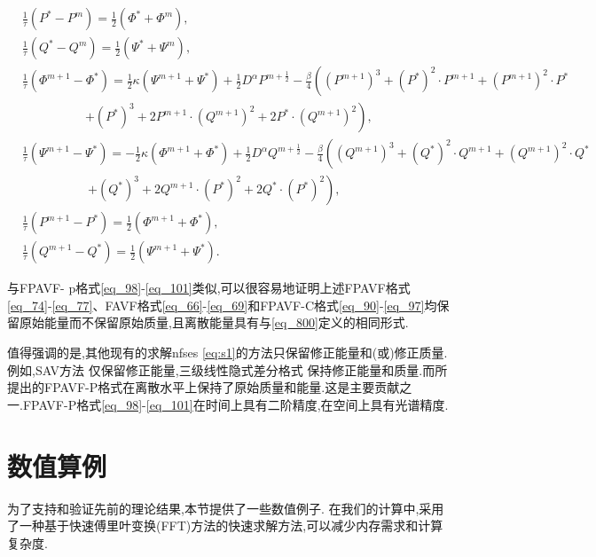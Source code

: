 \begin{enumerate}[$\bullet$]
\begin{align}
&\frac{1}{\tau}\left(P^{*}-P^{m}\right)=\frac{1}{2}(\varPhi^{*}+\varPhi^{m}),\label{eq_92}\\
&\frac{1}{\tau}\left(Q^{*}-Q^{m}\right)=\frac{1}{2}(\Psi^{*}+\Psi^{m}),\label{eq_93}\\
&\frac{1}{\tau}\left(\varPhi^{m+1}-\varPhi^{*}\right)=\frac{1}{2}\kappa (\Psi^{m+1}+\Psi^{*})+\frac{1}{2}D^{\alpha} P^{m+\frac{1}{2}}-\frac{\beta}{4}\left((P^{m+1})^3+(P^{*})^{2}\cdot P^{m+1}+(P^{m+1})^{2}\cdot P^{*}\right.\nonumber\\
		&~~~~~~~~~~~~~~~~~~~~~~~\left.+ (P^{*})^{3}+2 P^{m+1}\cdot (Q^{m+1})^{2}+2 P^{*}\cdot (Q^{m+1})^{2}\right),\label{eq_94}\\
&\frac{1}{\tau}\left(\Psi^{m+1}-\Psi^{*}\right)=-\frac{1}{2}\kappa (\varPhi^{m+1}+\varPhi^{*})+\frac{1}{2}D^{\alpha} Q^{m+\frac{1}{2}}-\frac{\beta}{4}\left((Q^{m+1})^3+(Q^{*})^{2}\cdot Q^{m+1}+(Q^{m+1})^{2}\cdot Q^{*}\right.\nonumber\\
		&~~~~~~~~~~~~~~~~~~~~~~~~\left.+ (Q^{*})^{3}+2 Q^{m+1}\cdot (P^{*})^{2}+2 Q^{*}\cdot (P^{*})^{2}\right),\label{eq_95}\\
&\frac{1}{\tau}\left(P^{m+1}-P^{*}\right)=\frac{1}{2}(\varPhi^{m+1}+\varPhi^{*}),\label{eq_96}\\
&\frac{1}{\tau}\left(Q^{m+1}-Q^{*}\right)=\frac{1}{2}(\Psi^{m+1}+\Psi^{*}).\label{eq_97}
\end{align}
\end{enumerate}



\begin{remark}\label{rmk1}
	与FPAVF- p格式\eqref{eq_98}-\eqref{eq_101}类似,可以很容易地证明上述FPAVF格式\eqref{eq_74}-\eqref{eq_77}、FAVF格式\eqref{eq_66}-\eqref{eq_69}和FPAVF-C格式\eqref{eq_90}-\eqref{eq_97}均保留原始能量而不保留原始质量,且离散能量具有与\eqref{eq_800}定义的相同形式.
\end{remark}

\begin{remark}\label{rmk2}
	值得强调的是,其他现有的求解nfses \eqref{eq:s1}的方法只保留修正能量和(或)修正质量.例如,SAV方法%
	仅保留修正能量,三级线性隐式差分格式%
	保持修正能量和质量.而所提出的FPAVF-P格式在离散水平上保持了原始质量和能量.这是主要贡献之一.FPAVF-P格式\eqref{eq_98}-\eqref{eq_101}在时间上具有二阶精度,在空间上具有光谱精度.\end{remark}

\section{数值算例}\label{Section 4}
为了支持和验证先前的理论结果,本节提供了一些数值例子.
在我们的计算中,采用了一种基于快速傅里叶变换(FFT)方法的快速求解方法,可以减少内存需求和计算复杂度.

